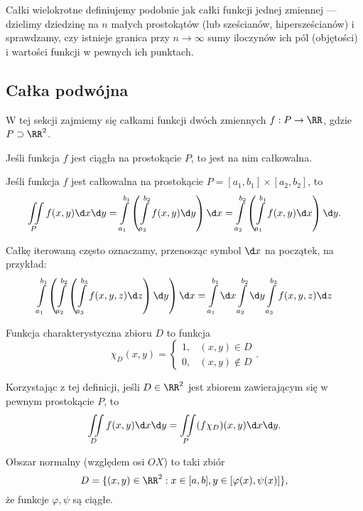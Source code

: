 Całki wielokrotne definiujemy podobnie jak całki funkcji jednej zmiennej --- dzielimy dziedzinę na $n$ małych prostokątów (lub sześcianów, hipersześcianów) i sprawdzamy, czy istnieje granica przy $n \to \infty$ sumy iloczynów ich pól (objętości) i wartości funkcji w pewnych ich punktach.

\subsection{Całka podwójna}
W tej sekcji zajmiemy się całkami funkcji dwóch zmiennych $f : P \to \RR$, gdzie $P \supset \RR^2$.

\begin{theorem}
    Jeśli funkcja $f$ jest ciągła na prostokącie $P$, to jest na nim całkowalna.
\end{theorem}

\begin{theorem}[Fubiniego]
    Jeśli funkcja $f$ jest całkowalna na prostokącie $P = [a_1, b_1] \times [a_2, b_2]$, to
    \[ \iint\limits_P f(x, y) \d x \d y = \int\limits_{a_1}^{b_1}\left(\int\limits_{a_2}^{b_2} f(x, y) \d y\right)\d x = \int\limits_{a_2}^{b_2}\left(\int\limits_{a_1}^{b_1} f(x, y) \d x\right)\d y. \]
\end{theorem}

Całkę iterowaną często oznaczamy, przenosząc symbol $\d x$ na początek, na przykład:
\[ \int\limits_{a_1}^{b_1} \left(\int\limits_{a_2}^{b_2} \left(\int\limits_{a_3}^{b_3} f(x, y, z) \d z\right)\d y\right)\d x = \int\limits_{a_1}^{b_1} \d x\int\limits_{a_2}^{b_2} \d y \int\limits_{a_3}^{b_3} f(x, y, z) \d z \]

\begin{definition}
    Funkcja charakterystyczna zbioru $D$ to funkcja
    \[ \chi_D(x, y) = \begin{cases}
        1, & (x, y) \in D \\
        0, & (x, y) \notin D
    \end{cases}. \]
\end{definition}

Korzystając z tej definicji, jeśli $D \in \RR^2$ jest zbiorem zawierającym się w pewnym prostokącie $P$, to
\[ \iint\limits_D f(x, y) \d x \d y = \iint\limits_P (f\chi_D)(x, y) \d x \d y. \]

\begin{definition}
    Obszar normalny (względem osi $OX$) to taki zbiór
    \[ D = \{(x, y) \in \RR^2 : x \in [a, b], y \in [\varphi(x), \psi(x)]\}, \]
    że funkcje $\varphi, \psi$ są ciągłe.
\end{definition}

